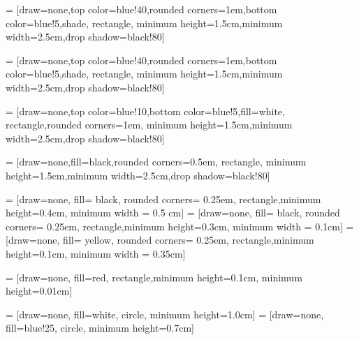 
 = [draw=none,top color=blue!40,rounded corners=1em,bottom color=blue!5,shade, rectangle, minimum height=1.5cm,minimum width=2.5cm,drop shadow=black!80]

 = [draw=none,top color=blue!40,rounded corners=1em,bottom color=blue!5,shade, rectangle, minimum height=1.5cm,minimum width=2.5cm,drop shadow=black!80]

 = [draw=none,top color=blue!10,bottom color=blue!5,fill=white, rectangle,rounded corners=1em, minimum height=1.5cm,minimum width=2.5cm,drop shadow=black!80]

 = [draw=none,fill=black,rounded corners=0.5em, rectangle, minimum height=1.5cm,minimum width=2.5cm,drop shadow=black!80]

 = [draw=none, fill= black, rounded corners= 0.25em, rectangle,minimum height=0.4cm, minimum width = 0.5 cm]
 = [draw=none, fill= black, rounded corners= 0.25em, rectangle,minimum height=0.3cm, minimum width = 0.1cm]
 = [draw=none, fill= yellow, rounded corners= 0.25em, rectangle,minimum height=0.1cm, minimum width = 0.35cm]

 = [draw=none, fill=red, rectangle,minimum height=0.1cm, minimum height=0.01cm]

 = [draw=none, fill=white, circle, minimum height=1.0cm]
 = [draw=none, fill=blue!25, circle, minimum height=0.7cm]

